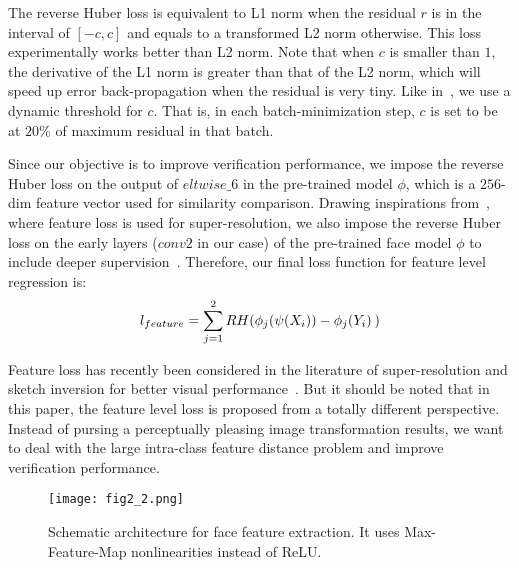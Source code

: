 \documentclass[10pt,twocolumn,letterpaper]{article}
\begin{document}
The reverse Huber loss is equivalent to L1 norm when the residual $r$ is in the interval of $[-c,c]$ and equals to a transformed L2 norm otherwise. This loss experimentally works better than L2 norm.
 Note that when $c$ is smaller than $1$, the derivative of the L1 norm is greater than that of the L2 norm, which will speed up error back-propagation when the residual is very tiny. Like in~\cite{laina2016deeper}, we use a dynamic threshold for $c$. That is, in each batch-minimization step, $c$ is set to be at $20\%$ of maximum residual in that batch.





Since our objective is to improve verification performance, we impose the reverse Huber loss on the output of $eltwise\_6$ in the pre-trained model $\phi$, which is a $256$-dim feature vector used for similarity comparison. Drawing inspirations from~\cite{johnson2016perceptual}, where feature loss is used for super-resolution, we also impose the reverse Huber loss on the early layers ($conv2$ in our case) of the pre-trained face model $\phi$ to include deeper supervision~\cite{lee2014deeply}. Therefore, our final loss function for feature level regression is:
\begin{equation}{l_{feature}} = \sum\limits_{j=1}^2 {RH({\phi _j}(\psi ({X_i})) - {\phi _j}({Y_i})} {\kern 1pt} {\kern 1pt} )
\end{equation}


Feature loss has recently been considered in the literature of super-resolution and sketch inversion for better visual performance~\cite{guccluturk2016convolutional,johnson2016perceptual,LedigTHCATTWS16}. But it should be noted that in this paper, the feature level loss is proposed from a totally different perspective. Instead of pursing a perceptually pleasing image transformation results, we want to deal with the large intra-class feature distance problem and improve verification performance.


\begin{figure}
  \centering
    \texttt{[image: fig2\_2.png]}
    \caption{Schematic architecture for face feature extraction. It uses Max-Feature-Map nonlinearities instead of ReLU.}
    \label{fig:face} %
\end{figure}
\end{document}

